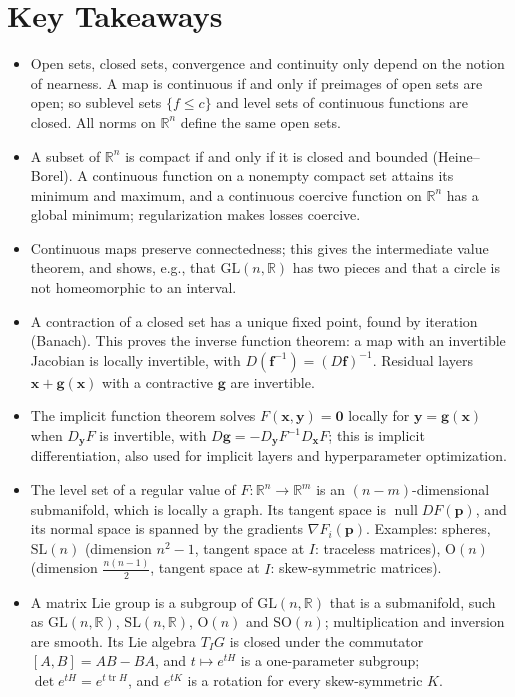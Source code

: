 \documentclass[11pt]{article}
\theoremstyle{definition}
\theoremstyle{plain}
\theoremstyle{remark}
\DeclareMathOperator{\Null}{null}
\DeclareMathOperator{\tr}{tr}
\begin{document}
\section*{Key Takeaways}
\begin{itemize}[leftmargin=*]
    \item Open sets, closed sets, convergence and continuity only depend on the notion of nearness. A map is continuous if and only if preimages of open sets are open; so sublevel sets $\{f \leq c\}$ and level sets of continuous functions are closed. All norms on $\mathbb{R}^n$ define the same open sets.
    \item A subset of $\mathbb{R}^n$ is compact if and only if it is closed and bounded (Heine--Borel). A continuous function on a nonempty compact set attains its minimum and maximum, and a continuous coercive function on $\mathbb{R}^n$ has a global minimum; regularization makes losses coercive.
    \item Continuous maps preserve connectedness; this gives the intermediate value theorem, and shows, e.g., that $\mathrm{GL}(n, \mathbb{R})$ has two pieces and that a circle is not homeomorphic to an interval.
    \item A contraction of a closed set has a unique fixed point, found by iteration (Banach). This proves the inverse function theorem: a map with an invertible Jacobian is locally invertible, with $D(\mathbf{f}^{-1}) = (D\mathbf{f})^{-1}$. Residual layers $\mathbf{x} + \mathbf{g}(\mathbf{x})$ with a contractive $\mathbf{g}$ are invertible.
    \item The implicit function theorem solves $F(\mathbf{x}, \mathbf{y}) = \mathbf{0}$ locally for $\mathbf{y} = \mathbf{g}(\mathbf{x})$ when $D_{\mathbf{y}}F$ is invertible, with $D\mathbf{g} = -D_{\mathbf{y}}F^{-1}D_{\mathbf{x}}F$; this is implicit differentiation, also used for implicit layers and hyperparameter optimization.
    \item The level set of a regular value of $F: \mathbb{R}^n \to \mathbb{R}^m$ is an $(n - m)$-dimensional submanifold, which is locally a graph. Its tangent space is $\Null DF(\mathbf{p})$, and its normal space is spanned by the gradients $\nabla F_i(\mathbf{p})$. Examples: spheres, $\mathrm{SL}(n)$ (dimension $n^2 - 1$, tangent space at $I$: traceless matrices), $\mathrm{O}(n)$ (dimension $\frac{n(n-1)}{2}$, tangent space at $I$: skew-symmetric matrices).
    \item A matrix Lie group is a subgroup of $\mathrm{GL}(n, \mathbb{R})$ that is a submanifold, such as $\mathrm{GL}(n, \mathbb{R})$, $\mathrm{SL}(n, \mathbb{R})$, $\mathrm{O}(n)$ and $\mathrm{SO}(n)$; multiplication and inversion are smooth. Its Lie algebra $T_IG$ is closed under the commutator $[A, B] = AB - BA$, and $t \mapsto e^{tH}$ is a one-parameter subgroup; $\det e^{tH} = e^{t\tr H}$, and $e^{tK}$ is a rotation for every skew-symmetric $K$.

\end{itemize}
\end{document}
